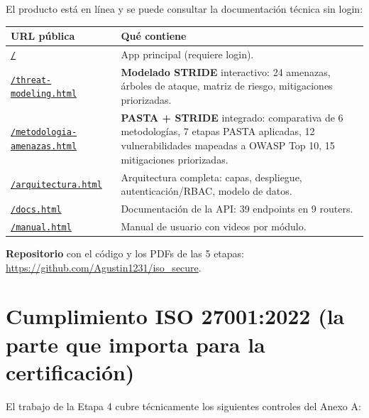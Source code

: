 \documentclass[12pt,a4paper,oneside]{article}
\begin{document}
El producto está en línea y se puede consultar la documentación técnica sin login:

\begin{table}[h]
\centering
\small
\begin{tabularx}{\textwidth}{lX}
\toprule
\textbf{URL pública} & \textbf{Qué contiene} \\
\midrule
\href{https://iso-secure.agustinynatalia.site/}{\texttt{/}} & App principal (requiere login). \\
\href{https://iso-secure.agustinynatalia.site/threat-modeling.html}{\texttt{/threat-modeling.html}} & \textbf{Modelado STRIDE} interactivo: 24 amenazas, árboles de ataque, matriz de riesgo, mitigaciones priorizadas. \\
\href{https://iso-secure.agustinynatalia.site/metodologia-amenazas.html}{\texttt{/metodologia-amenazas.html}} & \textbf{PASTA + STRIDE} integrado: comparativa de 6 metodologías, 7 etapas PASTA aplicadas, 12 vulnerabilidades mapeadas a OWASP Top 10, 15 mitigaciones priorizadas. \\
\href{https://iso-secure.agustinynatalia.site/arquitectura.html}{\texttt{/arquitectura.html}} & Arquitectura completa: capas, despliegue, autenticación/RBAC, modelo de datos. \\
\href{https://iso-secure.agustinynatalia.site/docs.html}{\texttt{/docs.html}} & Documentación de la API: 39 endpoints en 9 routers. \\
\href{https://iso-secure.agustinynatalia.site/manual.html}{\texttt{/manual.html}} & Manual de usuario con videos por módulo. \\
\bottomrule
\end{tabularx}
\end{table}

\textbf{Repositorio} con el código y los PDFs de las 5 etapas: \url{https://github.com/Agustin1231/iso_secure}.

\section{Cumplimiento ISO 27001:2022 (la parte que importa para la certificación)}

El trabajo de la Etapa 4 cubre técnicamente los siguientes controles del Anexo A:
\end{document}
